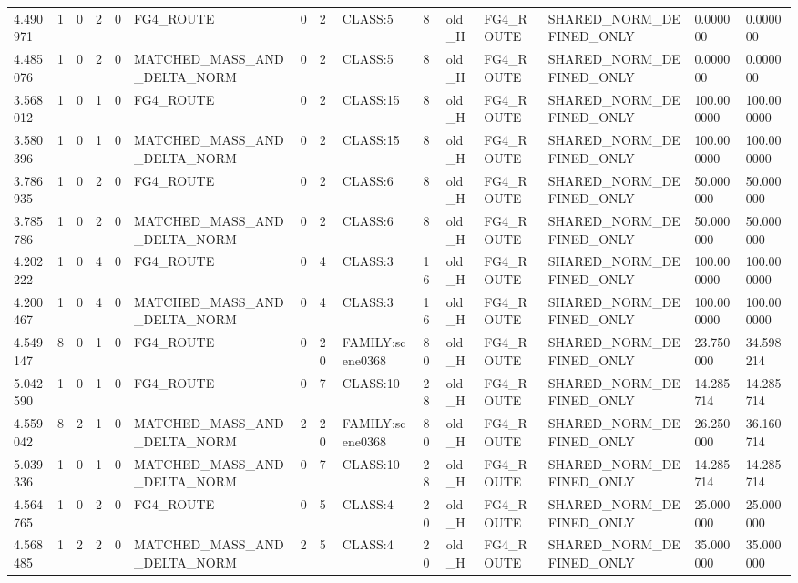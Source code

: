 \begin{tabular}{lllllllllllllll}
4.490971 & 1 & 0 & 2 & 0 & FG4\_ROUTE & 0 & 2 & CLASS:5 & 8 & old\_H & FG4\_ROUTE & SHARED\_NORM\_DEFINED\_ONLY & 0.000000 & 0.000000 \\
4.485076 & 1 & 0 & 2 & 0 & MATCHED\_MASS\_AND\_DELTA\_NORM & 0 & 2 & CLASS:5 & 8 & old\_H & FG4\_ROUTE & SHARED\_NORM\_DEFINED\_ONLY & 0.000000 & 0.000000 \\
3.568012 & 1 & 0 & 1 & 0 & FG4\_ROUTE & 0 & 2 & CLASS:15 & 8 & old\_H & FG4\_ROUTE & SHARED\_NORM\_DEFINED\_ONLY & 100.000000 & 100.000000 \\
3.580396 & 1 & 0 & 1 & 0 & MATCHED\_MASS\_AND\_DELTA\_NORM & 0 & 2 & CLASS:15 & 8 & old\_H & FG4\_ROUTE & SHARED\_NORM\_DEFINED\_ONLY & 100.000000 & 100.000000 \\
3.786935 & 1 & 0 & 2 & 0 & FG4\_ROUTE & 0 & 2 & CLASS:6 & 8 & old\_H & FG4\_ROUTE & SHARED\_NORM\_DEFINED\_ONLY & 50.000000 & 50.000000 \\
3.785786 & 1 & 0 & 2 & 0 & MATCHED\_MASS\_AND\_DELTA\_NORM & 0 & 2 & CLASS:6 & 8 & old\_H & FG4\_ROUTE & SHARED\_NORM\_DEFINED\_ONLY & 50.000000 & 50.000000 \\
4.202222 & 1 & 0 & 4 & 0 & FG4\_ROUTE & 0 & 4 & CLASS:3 & 16 & old\_H & FG4\_ROUTE & SHARED\_NORM\_DEFINED\_ONLY & 100.000000 & 100.000000 \\
4.200467 & 1 & 0 & 4 & 0 & MATCHED\_MASS\_AND\_DELTA\_NORM & 0 & 4 & CLASS:3 & 16 & old\_H & FG4\_ROUTE & SHARED\_NORM\_DEFINED\_ONLY & 100.000000 & 100.000000 \\
4.549147 & 8 & 0 & 1 & 0 & FG4\_ROUTE & 0 & 20 & FAMILY:scene0368 & 80 & old\_H & FG4\_ROUTE & SHARED\_NORM\_DEFINED\_ONLY & 23.750000 & 34.598214 \\
5.042590 & 1 & 0 & 1 & 0 & FG4\_ROUTE & 0 & 7 & CLASS:10 & 28 & old\_H & FG4\_ROUTE & SHARED\_NORM\_DEFINED\_ONLY & 14.285714 & 14.285714 \\
4.559042 & 8 & 2 & 1 & 0 & MATCHED\_MASS\_AND\_DELTA\_NORM & 2 & 20 & FAMILY:scene0368 & 80 & old\_H & FG4\_ROUTE & SHARED\_NORM\_DEFINED\_ONLY & 26.250000 & 36.160714 \\
5.039336 & 1 & 0 & 1 & 0 & MATCHED\_MASS\_AND\_DELTA\_NORM & 0 & 7 & CLASS:10 & 28 & old\_H & FG4\_ROUTE & SHARED\_NORM\_DEFINED\_ONLY & 14.285714 & 14.285714 \\
4.564765 & 1 & 0 & 2 & 0 & FG4\_ROUTE & 0 & 5 & CLASS:4 & 20 & old\_H & FG4\_ROUTE & SHARED\_NORM\_DEFINED\_ONLY & 25.000000 & 25.000000 \\
4.568485 & 1 & 2 & 2 & 0 & MATCHED\_MASS\_AND\_DELTA\_NORM & 2 & 5 & CLASS:4 & 20 & old\_H & FG4\_ROUTE & SHARED\_NORM\_DEFINED\_ONLY & 35.000000 & 35.000000 \\

\end{tabular}
